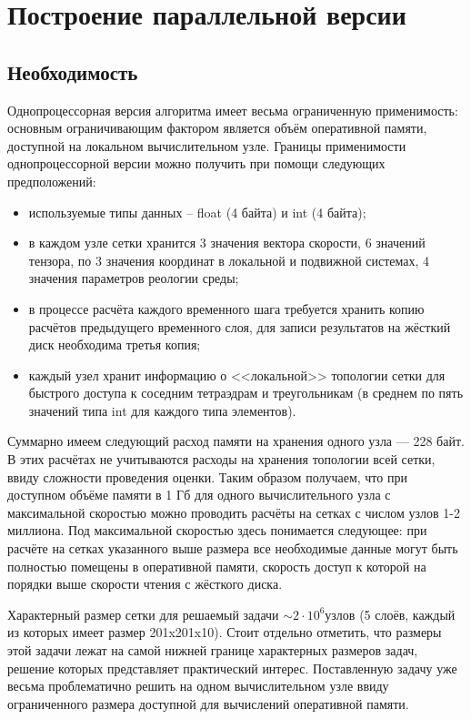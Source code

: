 \section{Построение параллельной версии}
\subsection{Необходимость}
Однопроцессорная версия алгоритма имеет весьма ограниченную применимость: основным ограничивающим фактором является объём оперативной памяти, доступной на локальном вычислительном узле. Границы применимости однопроцессорной версии можно получить при помощи следующих предположений:
\begin{itemize}
	\item используемые типы данных -- float (4 байта) и int (4 байта);
	\item в каждом узле сетки хранится 3 значения вектора скорости, 6 значений тензора, по 3 значения координат в локальной и подвижной системах, 4 значения параметров реологии среды;
	\item в процессе расчёта каждого временного шага требуется хранить копию расчётов предыдущего временного слоя, для записи результатов на жёсткий диск необходима третья копия;
	\item каждый узел хранит информацию о <<локальной>> топологии сетки для быстрого доступа к соседним тетраэдрам и треугольникам (в среднем по пять значений типа int для каждого типа элементов).
\end{itemize}

Суммарно имеем следующий расход памяти на хранения одного узла — 228 байт. В этих
расчётах не учитываются расходы на хранения топологии всей сетки, ввиду
сложности проведения оценки. Таким образом получаем, что при доступном объёме
памяти в 1 Гб для одного вычислительного узла с максимальной скоростью можно
проводить расчёты на сетках с числом узлов 1-2 миллиона. Под максимальной
скоростью здесь понимается следующее: при расчёте на сетках указанного выше
размера все необходимые данные могут быть полностью помещены в оперативной
памяти, скорость доступ к которой на порядки выше скорости чтения с жёсткого
диска.

Характерный размер сетки для решаемый задачи $\sim 2\cdot 10^6$узлов (5 слоёв,
каждый из которых имеет размер 201x201x10). Стоит
отдельно отметить, что размеры этой задачи лежат на самой нижней границе
характерных размеров задач, решение которых представляет практический интерес.
Поставленную задачу уже весьма проблематично решить на одном вычислительном узле
ввиду ограниченного размера доступной для вычислений оперативной памяти.

